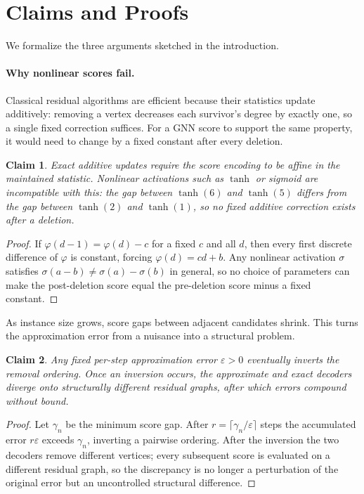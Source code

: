 \documentclass[11pt]{article}
\theoremstyle{plain}
\theoremstyle{remark}
\theoremstyle{plain}
\newtheorem{claim}{Claim}[section]
\begin{document}
\section{Claims and Proofs}
\label{sec:theory}

We formalize the three arguments sketched in the introduction.

\paragraph{Why nonlinear scores fail.}
Classical residual algorithms are efficient because their statistics update additively:
removing a vertex decreases each survivor's degree by exactly one, so a single fixed
correction suffices. For a GNN score to support the same property, it would need to
change by a fixed constant after every deletion.

\begin{claim}
  Exact additive updates require the score encoding to be affine in the maintained
  statistic. Nonlinear activations such as $\tanh$ or sigmoid are incompatible with
  this: the gap between $\tanh(6)$ and $\tanh(5)$ differs from the gap between
  $\tanh(2)$ and $\tanh(1)$, so no fixed additive correction exists after a deletion.
\end{claim}
\begin{proof}
  If $\varphi(d-1) = \varphi(d) - c$ for a fixed $c$ and all $d$, then every first
  discrete difference of $\varphi$ is constant, forcing $\varphi(d) = cd + b$. Any
  nonlinear activation $\sigma$ satisfies $\sigma(a-b) \neq \sigma(a) - \sigma(b)$
  in general, so no choice of parameters can make the post-deletion score equal the
  pre-deletion score minus a fixed constant.
\end{proof}

As instance size grows, score gaps between adjacent candidates shrink. This turns the
approximation error from a nuisance into a structural problem.

\begin{claim}
  Any fixed per-step approximation error $\varepsilon > 0$ eventually inverts the
  removal ordering. Once an inversion occurs, the approximate and exact decoders
  diverge onto structurally different residual graphs, after which errors compound
  without bound.
\end{claim}
\begin{proof}
  Let $\gamma_n$ be the minimum score gap. After $r = \lceil\gamma_n/\varepsilon\rceil$
  steps the accumulated error $r\varepsilon$ exceeds $\gamma_n$, inverting a pairwise
  ordering. After the inversion the two decoders remove different vertices; every
  subsequent score is evaluated on a different residual graph, so the discrepancy is
  no longer a perturbation of the original error but an uncontrolled structural
  difference.
\end{proof}
\end{document}
